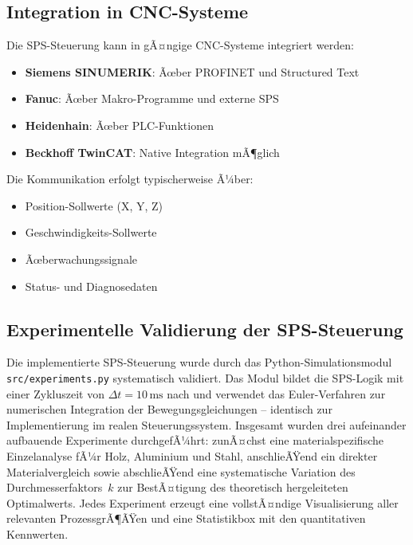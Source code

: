 ﻿\documentclass[12pt,a4paper]{article}
\begin{document}
\subsection{Integration in CNC-Systeme}

Die SPS-Steuerung kann in gÃ¤ngige CNC-Systeme integriert werden:

\begin{itemize}
	\item \textbf{Siemens SINUMERIK}: Ãœber PROFINET und Structured Text
	\item \textbf{Fanuc}: Ãœber Makro-Programme und externe SPS
	\item \textbf{Heidenhain}: Ãœber PLC-Funktionen
	\item \textbf{Beckhoff TwinCAT}: Native Integration mÃ¶glich
\end{itemize}

Die Kommunikation erfolgt typischerweise Ã¼ber:
\begin{itemize}
	\item Position-Sollwerte (X, Y, Z)
	\item Geschwindigkeits-Sollwerte
	\item Ãœberwachungssignale
	\item Status- und Diagnosedaten
\end{itemize}

\subsection{Experimentelle Validierung der SPS-Steuerung}

Die implementierte SPS-Steuerung wurde durch das Python-Simulationsmodul \texttt{src/\allowbreak{}experiments.py} systematisch validiert. Das Modul bildet die SPS-Logik mit einer Zykluszeit von $\Delta t = 10\,\text{ms}$ nach und verwendet das Euler-Verfahren zur numerischen Integration der Bewegungsgleichungen -- identisch zur Implementierung im realen Steuerungssystem. Insgesamt wurden drei aufeinander aufbauende Experimente durchgefÃ¼hrt: zunÃ¤chst eine materialspezifische Einzelanalyse fÃ¼r Holz, Aluminium und Stahl, anschlieÃŸend ein direkter Materialvergleich sowie abschlieÃŸend eine systematische Variation des Durchmesserfaktors~$k$ zur BestÃ¤tigung des theoretisch hergeleiteten Optimalwerts. Jedes Experiment erzeugt eine vollstÃ¤ndige Visualisierung aller relevanten ProzessgrÃ¶ÃŸen und eine Statistikbox mit den quantitativen Kennwerten.

\end{document}
